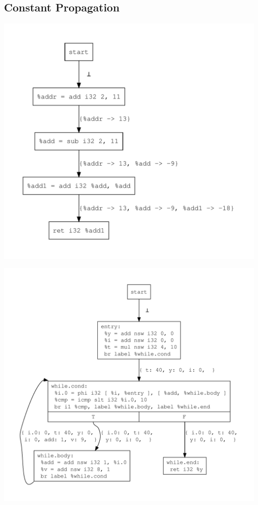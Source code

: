 \documentclass{article}
\theoremstyle{definition}
\begin{document}
\subsection{Constant Propagation}
\begin{center}
  \includegraphics[scale=.4]{figures/cp/simple_add/simple_add.pdf}
\end{center}

\begin{center}
  \includegraphics[scale=.4]{figures/cp/cp_loop/cp_loop.pdf}
\end{center}
\end{document}
